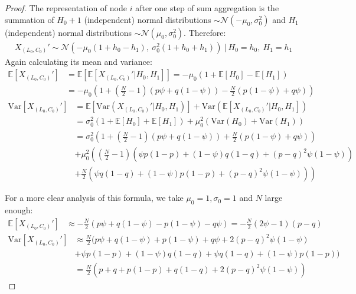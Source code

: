 \begin{proof}
The representation of node $i$ after one step of sum aggregation is the summation of $H_0+1$ (independent) normal distributions $\sim\mathcal{N}(-\mu_0,\sigma_0^2)$ and $H_1$ (independent) normal distributions $\sim\mathcal{N}(\mu_0,\sigma_0^2)$. Therefore:
\begin{align*}
	X_{(L_0,C_0)}' \sim
	\mathcal{N}(-\mu_0(1+h_{0}-h_{1}),\ \sigma^2_0(1+h_{0}+h_{1})) \ |\ H_{0}=h_{0},\ H_{1}=h_{1} 
\end{align*}
Again calculating its mean and variance:
 \begin{align*}
 \mathbb{E}[X_{(L_0,C_0)}'] &= \mathbb{E}[\mathbb{E}[X_{(L_0,C_0)}'|H_0,H_1]] = -\mu_0(1+\mathbb{E}[H_{0}]-\mathbb{E}[H_{1}]) \\
 &= -\mu_0\left(1+\left(\frac{N}{2}-1\right) (p \psi + q (1-\psi))-\frac{N}{2} (p (1-\psi) + q \psi) \right)
 \end{align*}
 \begin{align*}
 \text{Var}[X_{(L_0,C_0)}'] &= \mathbb{E}[\text{Var}(X_{(L_0,C_0)}'|H_0,H_1)]+\text{Var}(\mathbb{E}[X_{(L_0,C_0)}'|H_0,H_1]) \\
 &= \sigma^2_0(1+\mathbb{E}[H_{0}]+\mathbb{E}[H_{1}]) +\mu_0^2(\text{Var}(H_0)+\text{Var}(H_{1})) \\
 &= \sigma^2_0 \left(1+\left(\frac{N}{2}-1\right) (p \psi + q (1-\psi))+\frac{N}{2} (p (1-\psi) + q \psi)\right) \\ 
 &+\mu_0^2\left(\left(\frac{N}{2}-1\right) (\psi p (1-p) + (1-\psi) q (1-q) + (p-q)^2\psi(1-\psi))\right. \\
 &+ \left.\frac{N}{2}(\psi q(1-q) + (1 - \psi)p(1-p)  +  (p-q)^2\psi(1-\psi))\right)
 \end{align*}

For a more clear analysis of this formula, we take $\mu_0=1,\sigma_0=1$ and $N$ large enough:
 \begin{align*}
 \mathbb{E}[X_{(L_0,C_0)}'] &\approx -\frac{N}{2} (p \psi + q (1-\psi)- p (1-\psi) - q \psi) = -\frac{N}{2} (2 \psi - 1) (p - q)
 \end{align*}
 \begin{align*}
 \text{Var}[X_{(L_0,C_0)}'] &\approx 
 \frac{N}{2} \bigg( p \psi + q (1-\psi) + p (1-\psi) + q \psi +  2(p-q)^2\psi(1-\psi)  \\ 
 &+\psi p (1-p) + (1-\psi) q (1-q) + \psi q(1-q) + (1 - \psi)p(1-p)  \bigg) \\
 &= 
 \frac{N}{2} ( p+q + p(1-p) + q(1- q)  +  2(p-q)^2\psi(1-\psi) )
 \end{align*}


\end{proof}
